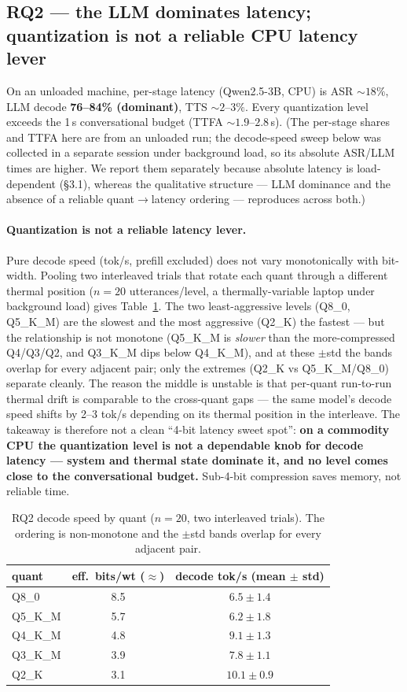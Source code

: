 \documentclass[11pt]{article}
\begin{document}
\subsection{RQ2 --- the LLM dominates latency; quantization is not a reliable CPU
latency lever}
On an unloaded machine, per-stage latency (Qwen2.5-3B, CPU) is ASR ${\sim}18\%$, LLM
decode \textbf{76--84\% (dominant)}, TTS ${\sim}2$--$3\%$. Every quantization level
exceeds the 1\,s conversational budget (TTFA ${\sim}1.9$--$2.8$\,s). (The per-stage
shares and TTFA here are from an unloaded run; the decode-speed sweep below was
collected in a separate session under background load, so its absolute ASR/LLM times
are higher. We report them separately because absolute latency is load-dependent
(\S3.1), whereas the qualitative structure --- LLM dominance and the absence of a
reliable quant$\rightarrow$latency ordering --- reproduces across both.)

\paragraph{Quantization is not a reliable latency lever.} Pure decode speed (tok/s,
prefill excluded) does not vary monotonically with bit-width. Pooling two interleaved
trials that rotate each quant through a different thermal position ($n{=}20$
utterances/level, a thermally-variable laptop under background load) gives
Table~\ref{tab:rq2}. The two least-aggressive levels (Q8\_0, Q5\_K\_M) are the slowest
and the most aggressive (Q2\_K) the fastest --- but the relationship is not monotone
(Q5\_K\_M is \emph{slower} than the more-compressed Q4/Q3/Q2, and Q3\_K\_M dips below
Q4\_K\_M), and at these $\pm$std the bands overlap for every adjacent pair; only the
extremes (Q2\_K vs Q5\_K\_M/Q8\_0) separate cleanly. The reason the middle is unstable
is that per-quant run-to-run thermal drift is comparable to the cross-quant gaps ---
the same model's decode speed shifts by 2--3 tok/s depending on its thermal position
in the interleave. The takeaway is therefore not a clean ``4-bit latency sweet spot'':
\textbf{on a commodity CPU the quantization level is not a dependable knob for decode
latency --- system and thermal state dominate it, and no level comes close to the
conversational budget.} Sub-4-bit compression saves memory, not reliable time.

\begin{table}[t]
\centering
\begin{tabular}{lcc}
\toprule
quant & eff.\ bits/wt ($\approx$) & decode tok/s (mean $\pm$ std) \\
\midrule
Q8\_0    & 8.5 & $6.5 \pm 1.4$ \\
Q5\_K\_M & 5.7 & $6.2 \pm 1.8$ \\
Q4\_K\_M & 4.8 & $9.1 \pm 1.3$ \\
Q3\_K\_M & 3.9 & $7.8 \pm 1.1$ \\
Q2\_K    & 3.1 & $\mathbf{10.1 \pm 0.9}$ \\
\bottomrule
\end{tabular}
\caption{RQ2 decode speed by quant ($n{=}20$, two interleaved trials). The ordering is
non-monotone and the $\pm$std bands overlap for every adjacent pair.}
\label{tab:rq2}
\end{table}
\end{document}
